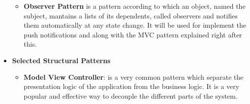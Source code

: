 \begin{itemize}[topsep=0pt]
\begin{itemize}[topsep=0pt]
            \item \textbf{Observer Pattern} is a pattern according to which an object, named the subject, mantains a lists of its dependents, called observers and notifies them automatically at any state change. It will be used for implement the push notifications and along with the MVC pattern explained right after this.
        \end{itemize}
    \item \textbf{Selected Structural Patterns}
        \begin{itemize}[topsep=0pt]
            \item \textbf{Model View Controller}: is a very common pattern which separate the presentation logic of the application from the business logic. It is a very popular and effective way to decouple the different parts of the system.
        \end{itemize}
\end{itemize}



